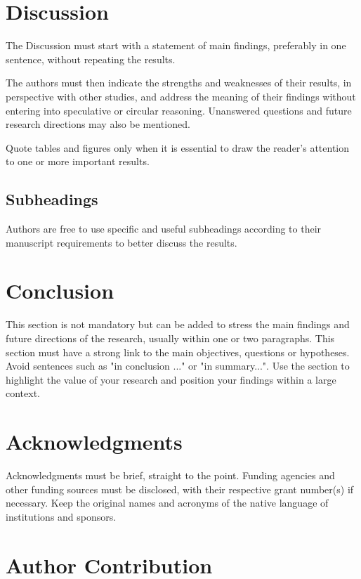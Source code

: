 \documentclass[draft]{OCR}
\begin{document}
\section{Discussion}

The Discussion must start with a statement of main findings, preferably in one sentence, without
repeating the results.

The authors must then indicate the strengths and weaknesses of their results, in perspective with
other studies, and address the meaning of their findings without entering into speculative or
circular reasoning. Unanswered questions and future research directions may also be mentioned.

Quote tables and figures only when it is essential to draw the reader's attention to one or more
important results. 

\subsection{Subheadings}

Authors are free to use specific and useful subheadings according to their manuscript requirements
to better discuss the results.

\section{Conclusion}

This section is not mandatory but can be added to stress the main findings and future directions of
the research, usually within one or two paragraphs. This section must have a strong link to the main
objectives, questions or hypotheses. Avoid sentences such as "in conclusion ..." or "in
summary...". Use the section to highlight the value of your research and position your findings
within a large context.

\section{Acknowledgments}

Acknowledgments must be brief, straight to the point. Funding agencies and other funding sources
must be disclosed, with their respective grant number(s) if necessary. Keep the original names and
acronyms of the native language of institutions and sponsors.

\section{Author Contribution}
\end{document}
